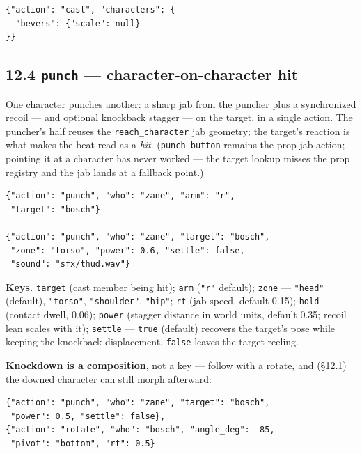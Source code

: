 \documentclass[
  12pt,
  letterpaper,
]{book}
\begin{document}
\begin{verbatim}
{"action": "cast", "characters": {
  "bevers": {"scale": null}
}}
\end{verbatim}

\subsection{\texorpdfstring{12.4 \texttt{punch} --- character-on-character
hit}{12.4 punch --- character-on-character hit}}\label{punch-action}

One character punches another: a sharp jab from the puncher plus a
synchronized recoil --- and optional knockback stagger --- on the
target, in a single action. The puncher's half reuses the
\texttt{reach\_character} jab geometry; the target's reaction is what
makes the beat read as a \emph{hit}. (\texttt{punch\_button} remains
the prop-jab action; pointing it at a character has never worked ---
the target lookup misses the prop registry and the jab lands at a
fallback point.)

\begin{verbatim}
{"action": "punch", "who": "zane", "arm": "r",
 "target": "bosch"}

{"action": "punch", "who": "zane", "target": "bosch",
 "zone": "torso", "power": 0.6, "settle": false,
 "sound": "sfx/thud.wav"}
\end{verbatim}

\textbf{Keys.} \texttt{target} (cast member being hit);
\texttt{arm} (\texttt{"r"} default); \texttt{zone} ---
\texttt{"head"} (default), \texttt{"torso"}, \texttt{"shoulder"},
\texttt{"hip"}; \texttt{rt} (jab speed, default 0.15);
\texttt{hold} (contact dwell, 0.06); \texttt{power} (stagger
distance in world units, default 0.35; recoil lean scales with it);
\texttt{settle} --- \texttt{true} (default) recovers the target's
pose while keeping the knockback displacement, \texttt{false} leaves
the target reeling.

\textbf{Knockdown is a composition}, not a key --- follow with a
rotate, and (§12.1) the downed character can still morph afterward:

\begin{verbatim}
{"action": "punch", "who": "zane", "target": "bosch",
 "power": 0.5, "settle": false},
{"action": "rotate", "who": "bosch", "angle_deg": -85,
 "pivot": "bottom", "rt": 0.5}
\end{verbatim}
\end{document}
